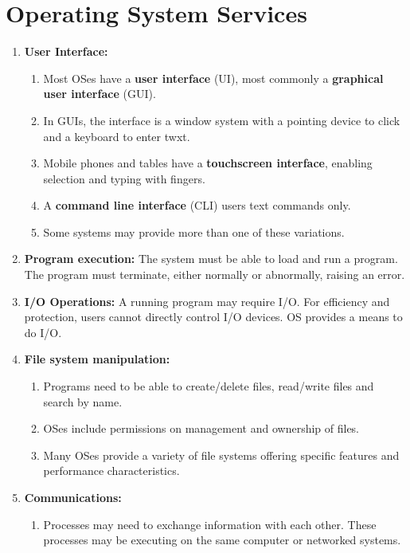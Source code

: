 \documentclass[journal,12pt,twocolumn]{IEEEtran}
\begin{document}
\section{Operating System Services}
\begin{enumerate}
    \item \textbf{User Interface:}
    \begin{enumerate}
        \item Most OSes have a \textbf{user interface} (UI), most commonly a
        \textbf{graphical user interface} (GUI).
        \item In GUIs, the interface is a window system with a pointing device to 
        click and a keyboard to enter twxt.
        \item Mobile phones and tables have a \textbf{touchscreen interface},
        enabling selection and typing with fingers.
        \item A \textbf{command line interface} (CLI) users text commands only.
        \item Some systems may provide more than one of these variations.
    \end{enumerate}
    \item \textbf{Program execution:} The system must be able to load and run 
    a program. The program must terminate, either normally or abnormally, 
    raising an error.
    \item \textbf{I/O Operations:} A running program may require I/O. For 
    efficiency and protection, users cannot directly control I/O devices. OS
    provides a means to do I/O.
    \item \textbf{File system manipulation:}
    \begin{enumerate}
        \item Programs need to be able to create/delete files, read/write files
        and search by name.
        \item OSes include permissions on management and ownership of files.
        \item Many OSes provide a variety of file systems offering specific
        features and performance characteristics.
    \end{enumerate}
    \item \textbf{Communications:}
    \begin{enumerate}
        \item Processes may need to exchange information with each other. These 
        processes may be executing on the same computer or networked systems.

\end{enumerate}
\end{enumerate}
\end{document}
